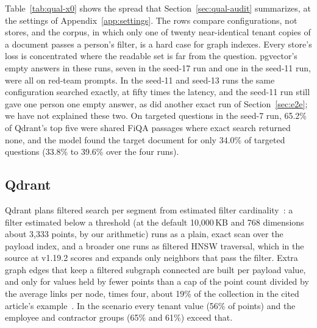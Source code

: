 Table~\ref{tab:qual-x0} shows the spread that Section~\ref{sec:qual-audit} summarizes, at the settings of
Appendix~\ref{app:settings}. The rows compare configurations, not stores, and the corpus, in which only one of
twenty near-identical tenant copies of a document passes a person's filter, is a hard case for graph
indexes. Every store's loss is concentrated where the
readable set is far from the question. pgvector's empty answers in these runs, seven in the seed-17 run and one in the seed-11
run, were all on red-team prompts. In the seed-11 and seed-13 runs the
same configuration searched exactly, at fifty times the latency, and the seed-11 run still gave one
person one empty answer, as did another exact run of Section~\ref{sec:e2e}; we have not explained
these two. On targeted
questions in the seed-7 run, 65.2\% of Qdrant's top five were shared FiQA passages where exact search
returned none, and the model found the target document for only 34.0\% of targeted questions
(33.8\% to 39.6\% over the four runs).

\subsection{Qdrant}\label{app:qdrant}

Qdrant plans filtered search per segment from estimated filter cardinality~\cite{qdrant2026search}: a filter estimated below
a threshold (at the default 10,000\,KB and 768 dimensions about 3,333 points, by our arithmetic) runs as a plain, exact
scan over the payload index, and a broader one runs as filtered HNSW traversal, which in the source at v1.19.2 scores and
expands only neighbors that pass the filter. Extra graph edges that keep a
filtered subgraph connected are built per payload value, and only for values held by fewer points
than a cap of the point count divided by the average links per node, times four, about 19\% of the collection in the cited article's example~\cite{couzon2026filtered}. In the scenario every tenant
value (56\% of points) and
the employee and contractor groups (65\% and 61\%) exceed that.

